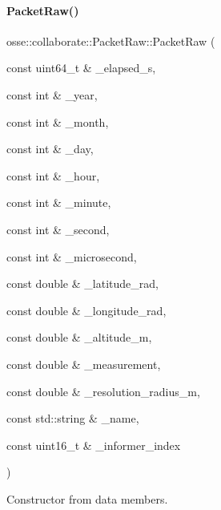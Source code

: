 \paragraph{\texorpdfstring{Packet\+Raw()}{PacketRaw()}\hspace{0.1cm}{\footnotesize\ttfamily [2/2]}}
{\footnotesize\ttfamily osse\+::collaborate\+::\+Packet\+Raw\+::\+Packet\+Raw (\begin{DoxyParamCaption}\item[{const uint64\+\_\+t \&}]{\+\_\+elapsed\+\_\+s,  }\item[{const int \&}]{\+\_\+year,  }\item[{const int \&}]{\+\_\+month,  }\item[{const int \&}]{\+\_\+day,  }\item[{const int \&}]{\+\_\+hour,  }\item[{const int \&}]{\+\_\+minute,  }\item[{const int \&}]{\+\_\+second,  }\item[{const int \&}]{\+\_\+microsecond,  }\item[{const double \&}]{\+\_\+latitude\+\_\+rad,  }\item[{const double \&}]{\+\_\+longitude\+\_\+rad,  }\item[{const double \&}]{\+\_\+altitude\+\_\+m,  }\item[{const double \&}]{\+\_\+measurement,  }\item[{const double \&}]{\+\_\+resolution\+\_\+radius\+\_\+m,  }\item[{const std\+::string \&}]{\+\_\+name,  }\item[{const uint16\+\_\+t \&}]{\+\_\+informer\+\_\+index }\end{DoxyParamCaption})}



Constructor from data members. 


